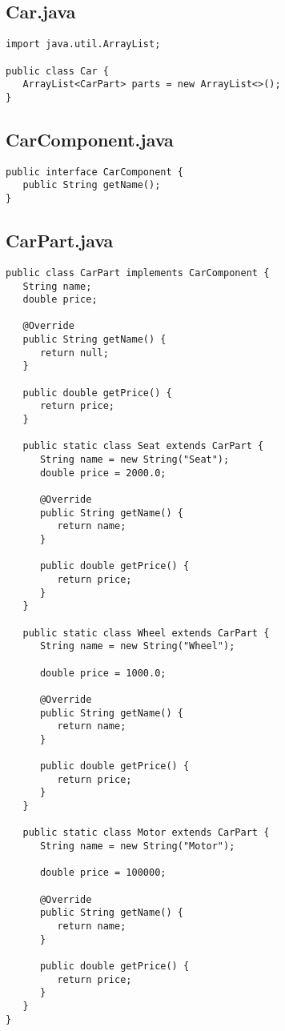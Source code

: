 \documentclass[12pt,a4paper,oneside,ngerman]{article}
\begin{document}
\subsection*{Car.java}
\begin{lstlisting}
import java.util.ArrayList;

public class Car {
   ArrayList<CarPart> parts = new ArrayList<>();
}

\end{lstlisting}

\subsection*{CarComponent.java}
\begin{lstlisting}
public interface CarComponent {
   public String getName();
}

\end{lstlisting}

\subsection*{CarPart.java}
\begin{lstlisting}
public class CarPart implements CarComponent {
   String name;
   double price;

   @Override
   public String getName() {
      return null;
   }

   public double getPrice() {
      return price;
   }

   public static class Seat extends CarPart {
      String name = new String("Seat");
      double price = 2000.0;

      @Override
      public String getName() {
         return name;
      }

      public double getPrice() {
         return price;
      }
   }

   public static class Wheel extends CarPart {
      String name = new String("Wheel");

      double price = 1000.0;

      @Override
      public String getName() {
         return name;
      }

      public double getPrice() {
         return price;
      }
   }

   public static class Motor extends CarPart {
      String name = new String("Motor");

      double price = 100000;

      @Override
      public String getName() {
         return name;
      }

      public double getPrice() {
         return price;
      }
   }
}

\end{lstlisting}
\end{document}
